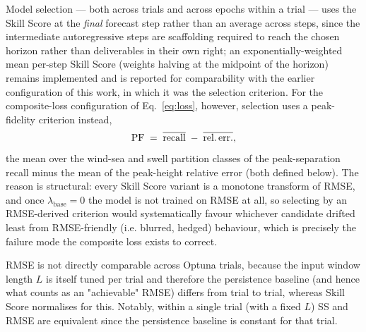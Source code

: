 Model selection — both across trials and across epochs within a trial — uses the Skill Score at the \emph{final} forecast step rather than an average across steps, since the intermediate autoregressive steps are scaffolding required to reach the chosen horizon rather than deliverables in their own right; an exponentially-weighted mean per-step Skill Score (weights halving at the midpoint of the horizon) remains implemented and is reported for comparability with the earlier configuration of this work, in which it was the selection criterion. For the composite-loss configuration of Eq.~\eqref{eq:loss}, however, selection uses a peak-fidelity criterion instead,
\begin{equation}
\text{PF} \;=\; \overline{\text{recall}} \;-\; \overline{\text{rel.\,err.}},
\end{equation}
the mean over the wind-sea and swell partition classes of the peak-separation recall minus the mean of the peak-height relative error (both defined below). The reason is structural: every Skill Score variant is a monotone transform of RMSE, and once $\lambda_{\text{base}} = 0$ the model is not trained on RMSE at all, so selecting by an RMSE-derived criterion would systematically favour whichever candidate drifted least from RMSE-friendly (i.e. blurred, hedged) behaviour, which is precisely the failure mode the composite loss exists to correct.

RMSE is not directly comparable across Optuna trials, because the input window length $L$ is itself tuned per trial and therefore the persistence baseline (and hence what counts as an "achievable" RMSE) differs from trial to trial, whereas Skill Score normalises for this. Notably, within a single trial (with a fixed $L$) SS and RMSE are equivalent since the persistence baseline is constant for that trial.

